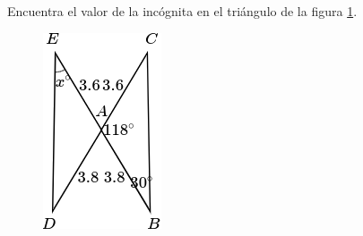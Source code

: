 Encuentra el valor de la incógnita en el triángulo de la figura \ref{fig:angle_triangle_27}.

\begin{minipage}[t]{0.2\textwidth}
    \begin{figure}[H]
        \centering
        \includegraphics[width=0.8\linewidth]{../images/angle_triangle_27.png}
        \caption{}
        \label{fig:angle_triangle_27}
    \end{figure}
\end{minipage}\hfill
\begin{minipage}[t]{0.75\textwidth}
    \begin{solutionbox}{5cm}

    \end{solutionbox}
\end{minipage}

